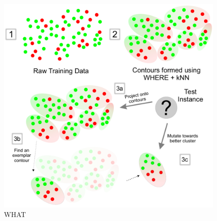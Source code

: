 \documentclass[conference]{IEEEtran}
\begin{document}
\begin{figure}
\centering
\includegraphics[width=\linewidth]{_figs/WHAT-Clusters2.pdf}
\caption{WHAT}
\label{fig:whatflow}
\end{figure}
\end{document}
